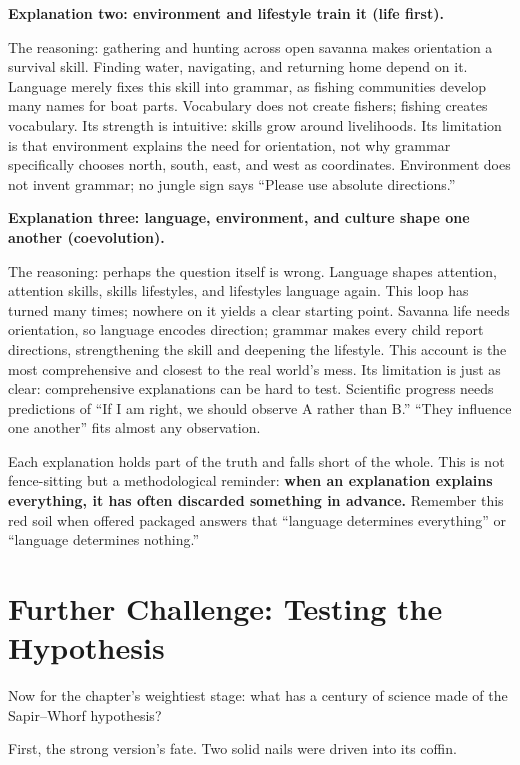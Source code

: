 \textbf{Explanation two: environment and lifestyle train it (life first).}

The reasoning: gathering and hunting across open savanna makes orientation a survival skill. Finding water, navigating, and returning home depend on it. Language merely fixes this skill into grammar, as fishing communities develop many names for boat parts. Vocabulary does not create fishers; fishing creates vocabulary. Its strength is intuitive: skills grow around livelihoods. Its limitation is that environment explains the need for orientation, not why grammar specifically chooses north, south, east, and west as coordinates. Environment does not invent grammar; no jungle sign says ``Please use absolute directions.''

\textbf{Explanation three: language, environment, and culture shape one another (coevolution).}

The reasoning: perhaps the question itself is wrong. Language shapes attention, attention skills, skills lifestyles, and lifestyles language again. This loop has turned many times; nowhere on it yields a clear starting point. Savanna life needs orientation, so language encodes direction; grammar makes every child report directions, strengthening the skill and deepening the lifestyle. This account is the most comprehensive and closest to the real world's mess. Its limitation is just as clear: comprehensive explanations can be hard to test. Scientific progress needs predictions of ``If I am right, we should observe A rather than B.'' ``They influence one another'' fits almost any observation.

Each explanation holds part of the truth and falls short of the whole. This is not fence-sitting but a methodological reminder: \textbf{when an explanation explains everything, it has often discarded something in advance.} Remember this red soil when offered packaged answers that ``language determines everything'' or ``language determines nothing.''

\section{Further Challenge: Testing the Hypothesis}
Now for the chapter's weightiest stage: what has a century of science made of the Sapir--Whorf hypothesis?

First, the strong version's fate. Two solid nails were driven into its coffin.

